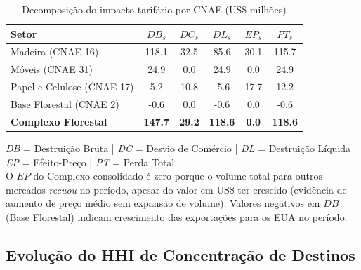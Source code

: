\documentclass[12pt, a4paper]{article}
\begin{document}
\begin{table}[H]
  \centering
  \caption{Decomposição do impacto tarifário por CNAE (US\$ milhões)}
  \label{tab:decomp}
  \renewcommand{\arraystretch}{1.4}
  \small
  \begin{tabular}{l
      S[table-format=3.1]
      S[table-format=2.1]
      S[table-format=3.1]
      S[table-format=2.1]
      S[table-format=3.1]}
    \toprule
    \textbf{Setor}
      & \textbf{$DB_s$}
      & \textbf{$DC_s$}
      & \textbf{$DL_s$}
      & \textbf{$EP_s$}
      & \textbf{$PT_s$} \\
    \midrule
    Madeira (CNAE 16)          & 118.1 & 32.5 &  85.6 & 30.1 & 115.7 \\
    Móveis (CNAE 31)           &  24.9 &  0.0 &  24.9 &  0.0 &  24.9 \\
    Papel e Celulose (CNAE 17) &   5.2 & 10.8 &  -5.6 & 17.7 &  12.2 \\
    Base Florestal (CNAE 2)    &  -0.6 &  0.0 &  -0.6 &  0.0 &  -0.6 \\
    \midrule
    \textbf{Complexo Florestal}
      & \textbf{147.7} & \textbf{29.2} & \textbf{118.6}
      & \textbf{0.0}   & \textbf{118.6} \\
    \bottomrule
  \end{tabular}
  \begin{minipage}{\textwidth}
    \vspace{4pt}\footnotesize
    \textit{DB} = Destruição Bruta \;|\;
    \textit{DC} = Desvio de Comércio \;|\;
    \textit{DL} = Destruição Líquida \;|\;
    \textit{EP} = Efeito-Preço \;|\;
    \textit{PT} = Perda Total.\\
    O $EP$ do Complexo consolidado é zero porque o volume total para outros mercados
    \emph{recuou} no período, apesar do valor em US\$ ter crescido
    (evidência de aumento de preço médio sem expansão de volume).
    Valores negativos em $DB$ (Base Florestal) indicam crescimento
    das exportações para os EUA no período.
  \end{minipage}
\end{table}

\subsection{Evolução do HHI de Concentração de Destinos}
\end{document}
